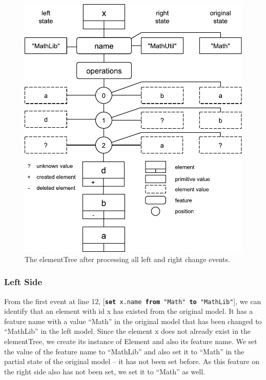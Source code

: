 \begin{figure}
    \includegraphics[width=\linewidth]{RightElementTreeDiagram}
    \caption{The \textsf{elementTree} after processing all left and right change events.}
    \label{fig:right_element_tree_diagram}
\end{figure}

\subsubsection{Left Side}\label{sec:left_side}

From the first event at line 12, [\texttt{\small \textbf{set} x.name \textbf{from} "Math" \textbf{to} "MathLib"}], we can identify that an element with id \textsf{x} has existed from the original model. 
It has a feature \textsf{name} with a value ``Math'' in the original model that has been changed to ``MathLib'' in the left model. Since the element \textsf{x} does not already exist in the \textsf{elementTree}, we create its instance of \textsf{Element} and also its feature \textsf{name}. We set the value of the feature \textsf{name} to ``MathLib'' and also set it to ``Math'' in the partial state of the original model -- it has not been set before. As this feature on the right side also has not been set, we set it to ``Math'' as well. 


